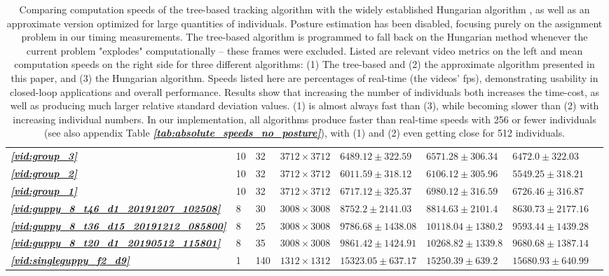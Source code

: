 \documentclass[9pt,lineno]{elife}
\newcommand{\vidref}[1]{\textit{\textbf{\ref{#1}}}}
\newcommand{\tableref}[1]{\textit{\textbf{\ref{tab:#1}}}\xspace}
\begin{document}
\begin{table}[h]
\begin{tabular}{l l l l | l l l l}
\vidref{vid:group_3} & 10 & 32 & $ 3712 \times 3712 $ & $ 6489.12 \pm 322.59 $ & $ 6571.28 \pm 306.34 $ & $ 6472.0 \pm 322.03 $ \\
\vidref{vid:group_2} & 10 & 32 & $ 3712 \times 3712 $ & $ 6011.59 \pm 318.12 $ & $ 6106.12 \pm 305.96 $ & $ 5549.25 \pm 318.21 $ \\
\vidref{vid:group_1} & 10 & 32 & $ 3712 \times 3712 $ & $ 6717.12 \pm 325.37 $ & $ 6980.12 \pm 316.59 $ & $ 6726.46 \pm 316.87 $ \\
\vidref{vid:guppy_8_t46_d1_20191207_102508} & 8 & 30 & $ 3008 \times 3008 $ & $ 8752.2 \pm 2141.03 $ & $ 8814.63 \pm 2101.4 $ & $ 8630.73 \pm 2177.16 $ \\
\vidref{vid:guppy_8_t36_d15_20191212_085800} & 8 & 25 & $ 3008 \times 3008 $ & $ 9786.68 \pm 1438.08 $ & $ 10118.04 \pm 1380.2 $ & $ 9593.44 \pm 1439.28 $ \\
\vidref{vid:guppy_8_t20_d1_20190512_115801} & 8 & 35 & $ 3008 \times 3008 $ & $ 9861.42 \pm 1424.91 $ & $ 10268.82 \pm 1339.8 $ & $ 9680.68 \pm 1387.14 $ \\
\vidref{vid:singleguppy_f2_d9} & 1 & 140 & $ 1312 \times 1312 $ & $ 15323.05 \pm 637.17 $ & $ 15250.39 \pm 639.2 $ & $ 15680.93 \pm 640.99 $ \\
\bottomrule
\end{tabular}
\medskip 
\caption{\label{tab:timings_apprx}Comparing computation speeds of the tree-based tracking algorithm with the widely established Hungarian algorithm \cite{kuhn1955hungarian}, as well as an approximate version optimized for large quantities of individuals. Posture estimation has been disabled, focusing purely on the assignment problem in our timing measurements. The tree-based algorithm is programmed to fall back on the Hungarian method whenever the current problem "explodes" computationally -- these frames were excluded. Listed are relevant video metrics on the left and mean computation speeds on the right side for three different algorithms: (1) The tree-based and (2) the approximate algorithm presented in this paper, and (3) the Hungarian algorithm. Speeds listed here are percentages of real-time (the videos' fps), demonstrating usability in closed-loop applications and overall performance. Results show that increasing the number of individuals both increases the time-cost, as well as producing much larger relative standard deviation values. (1) is almost always fast than (3), while becoming slower than (2) with increasing individual numbers. In our implementation, all algorithms produce faster than real-time speeds with 256 or fewer individuals (see also appendix Table \tableref{absolute_speeds_no_posture}), with (1) and (2) even getting close for 512 individuals.}
\end{table}
\end{document}
